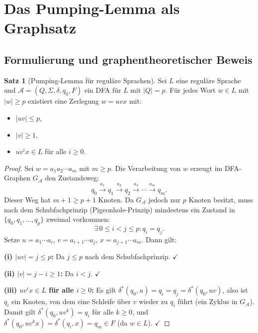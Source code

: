 ﻿\documentclass[a4paper,12pt]{article}
\theoremstyle{definition}
\newtheorem{satz}{Satz}
\begin{document}
\section{Das Pumping-Lemma als Graphsatz}

\subsection{Formulierung und graphentheoretischer Beweis}

\begin{satz}[Pumping-Lemma f\"ur regul\"are Sprachen]
\label{satz:pumping}
Sei $L$ eine regul\"are Sprache und $\mathcal{A} = (Q, \Sigma, \delta, q_0, F)$
ein DFA f\"ur $L$ mit $|Q| = p$. F\"ur jedes Wort $w \in L$ mit $|w| \geq p$
existiert eine Zerlegung $w = uvx$ mit:
\begin{itemize}
    \item $|uv| \leq p$,
    \item $|v| \geq 1$,
    \item $uv^i x \in L$ f\"ur alle $i \geq 0$.
\end{itemize}
\end{satz}

\begin{proof}
Sei $w = a_1 a_2 \cdots a_m$ mit $m \geq p$. Die Verarbeitung von $w$
erzeugt im DFA-Graphen $G_{\mathcal{A}}$ den Zustandsweg:
\[
q_0 \xrightarrow{a_1} q_1 \xrightarrow{a_2} q_2 \xrightarrow{a_3} \cdots
\xrightarrow{a_m} q_m.
\]
Dieser Weg hat $m+1 \geq p+1$ Knoten. Da $G_{\mathcal{A}}$ jedoch nur $p$ Knoten
besitzt, muss nach dem Schubfachprinzip (Pigeonhole-Prinzip) mindestens ein
Zustand in $\{q_0, q_1, \ldots, q_p\}$ zweimal vorkommen:
\[
\exists\, 0 \leq i < j \leq p: q_i = q_j.
\]
Setze $u = a_1 \cdots a_i$, $v = a_{i+1} \cdots a_j$, $x = a_{j+1} \cdots a_m$.
Dann gilt:

\textbf{(i) $|uv| = j \leq p$:} Da $j \leq p$ nach dem Schubfachprinzip. $\checkmark$

\textbf{(ii) $|v| = j - i \geq 1$:} Da $i < j$. $\checkmark$

\textbf{(iii) $uv^i x \in L$ f\"ur alle $i \geq 0$:}
Es gilt $\delta^*(q_0, u) = q_i = q_j = \delta^*(q_0, uv)$,
also ist $q_i$ ein Knoten, von dem eine Schleife \"uber $v$ wieder
zu $q_i$ f\"uhrt (ein Zyklus in $G_{\mathcal{A}}$).
Damit gilt $\delta^*(q_0, uv^k) = q_i$ f\"ur alle $k \geq 0$, und
$\delta^*(q_0, uv^k x) = \delta^*(q_i, x) = q_m \in F$ (da $w \in L$). $\checkmark$
\end{proof}
\end{document}
